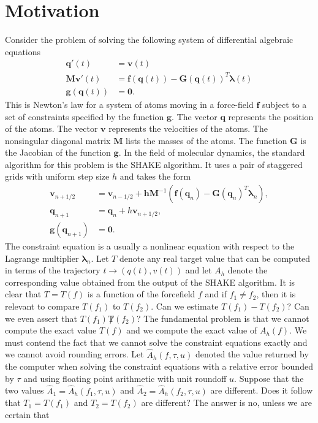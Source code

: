 \documentclass[runningheads]{llncs}
\begin{document}
\section{Motivation} Consider the problem of solving the following system of differential algebraic equations
\begin{align}
  \bm{q}'(t) &= \bm{v}(t) \\
  \bm{M}\bm{v}'(t) &= \bm{f}(\bm{q}(t)) - \bm{G}(\bm{q}(t))^T\bm{\lambda}(t) \\
  \bm{g}(\bm{q}(t)) &= \bm{0}. 
\end{align}
This is Newton's law for a system of atoms moving in a force-field $\bm{f}$ subject to a set of constraints specified by the function $\bm{g}$.
The vector $\bm{q}$ represents the position of the atoms.
The vector $\bm{v}$ represents the velocities of the atoms.
The nonsingular diagonal matrix $\bm{M}$ lists the masses of the atoms.
The function $\bm{G}$ is the Jacobian of the function $\bm{g}$.
In the field of molecular dynamics, the standard algorithm for this problem is the SHAKE algorithm.
It uses a pair of staggered grids with uniform step size $h$ and takes the form
\begin{align}
  \bm{v}_{n+1/2} &= \bm{v}_{n-1/2} + \bm{h} \bm{M}^{-1} \left( \bm{f}(\bm{q}_n) - \bm{G}(\bm{q}_n)^T \bm{\lambda}_n \right), \\
  \bm{q}_{n+1} &= \bm{q}_n + h \bm{v}_{n + 1/2}, \\
  \bm{g}(\bm{q}_{n+1}) &= \bm{0}.
\end{align}
The constraint equation is a usually a nonlinear equation with respect to the Lagrange multiplier $\bm{\lambda}_n$. 
Let $T$ denote any real target value that can be computed in terms of the trajectory $t \rightarrow (q(t), v(t))$ and let $A_h$ denote the corresponding value obtained from the output of the SHAKE algorithm. It is clear that $T = T(f)$ is a function of the forcefield $f$ and if $f_1 \not = f_2$, then it is relevant to compare $T(f_1)$ to $T(f_2)$. Can we estimate $T(f_1) - T(f_2)$? Can we even assert that $T(f_1) \not T(f_2)$? The fundamental problem is that we cannot compute the exact value $T(f)$ and we compute the exact value of $A_h(f)$. We must contend the fact that we cannot solve the constraint equations exactly and we cannot avoid rounding errors. Let $\hat{A}_h(f, \tau, u)$ denoted the value returned by the computer when solving the constraint equations with a relative error bounded by $\tau$ and using floating point arithmetic with unit roundoff $u$. Suppose that the two values $\hat{A}_1 = \hat{A}_h(f_1, \tau, u)$ and $\hat{A}_2 = \hat{A}_h(f_2, \tau, u)$ are different. Does it follow that $T_1 = T(f_1)$ and $T_2 = T(f_2)$ are different? The answer is no, unless we are certain that
\end{document}

